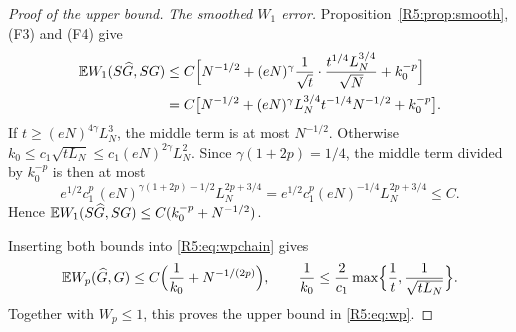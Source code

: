 \documentclass[11pt]{amsart}
\theoremstyle{definition}
\theoremstyle{remark}
\begin{document}
\begin{proof}[Proof of the upper bound]
\emph{The smoothed $W_1$ error.}  Proposition~\ref{R5:prop:smooth}, (F3)
and (F4) give
\begin{align*}
 \mathbb{E} W_1(S\widehat G,SG)&\le C\Bigl[N^{-1/2}+(eN)^{\gamma}\frac{1}{\sqrt t}\cdot
 \frac{t^{1/4}L_N^{3/4}}{\sqrt N}+k_0^{-p}\Bigr]\\
 &=C\bigl[N^{-1/2}+(eN)^{\gamma}L_N^{3/4}t^{-1/4}N^{-1/2}+k_0^{-p}\bigr].
\end{align*}
If $t\ge(eN)^{4\gamma}L_N^3$, the middle term is at most $N^{-1/2}$.
Otherwise $k_0\le c_1\sqrt{tL_N}\le c_1(eN)^{2\gamma}L_N^2$.  Since
$\gamma(1+2p)=1/4$, the middle term divided by $k_0^{-p}$ is then at most
\[
 e^{1/2}c_1^p\,(eN)^{\gamma(1+2p)-1/2}L_N^{2p+3/4}=e^{1/2}c_1^p(eN)^{-1/4}L_N^{2p+3/4}\le C .
\]
Hence $\mathbb{E} W_1(S\widehat G,SG)\le C(k_0^{-p}+N^{-1/2})$.

Inserting both bounds into \eqref{R5:eq:wpchain} gives
\[
 \mathbb{E} W_p(\widehat G,G)\le C\Bigl(\frac1{k_0}+N^{-1/(2p)}\Bigr),
 \qquad
 \frac1{k_0}\le\frac2{c_1}\max\Bigl\{\frac1t,\frac1{\sqrt{tL_N}}\Bigr\}.
\]
Together with $W_p\le1$, this proves the upper bound in \eqref{R5:eq:wp}.
\end{proof}
\end{document}
